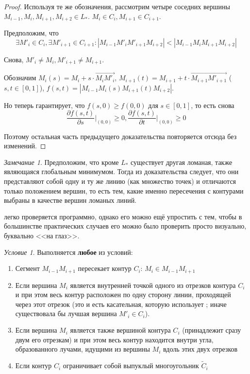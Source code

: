\documentclass[14pt]{extarticle}
\theoremstyle{plain}%
\theoremstyle{remark}
\newtheorem{remark}{Замечание}
\newtheorem{condition}{Условие}
\begin{document}
\begin{proof}
Используя те же обозначения,
рассмотрим четыре соседних вершины
$M_{i-1}, M_i, M_{i+1}, M_{i+2} \in L_*$.
$M_i \in  C_i,
M_{i+1} \in C_{i+1}$.

Предположим, что
$$
\exists M'_i \in C_i,
\exists M'_{i+1} \in C_{i+1}:
|M_{i-1} M'_i M'_{i+1} M_{i+2}|
<
|M_{i-1} M_i M_{i+1} M_{i+2}|
$$

Снова,
$
M'_i \ne M_i,
M'_{i+1} \ne M_{i+1}
$.

Обозначим
$
M_i(s)=M_i+s \cdot \overrightarrow{M_i M'_i}
$,
$
 M_{i+1}(t)= M_{i+1}+t \cdot \overrightarrow{M_{i+1} M'_{i+1}}
$
($s,t \in[0,1]$),
$f(s,t)=
|M_{i-1} M_i(s) M_{i+1}(t) M_{i+2}|
$.

Но теперь
гарантирует, что
$f(s,0)\geqslant f(0,0)$
для
$s\in[0,1]$,
то есть снова
\begin{equation}
  \frac{\partial f(s,t)}{\partial s} \Big|_{(0,0)} \geqslant 0,
  \frac{\partial f(s,t)}{\partial t} \Big|_{(0,0)} \geqslant 0
\end{equation}

Поэтому остальная часть предыдущего доказательства
повторяется отсюда без изменений.
\end{proof}

\begin{remark}
Предположим,
что кроме
$L_*$
существует другая ломаная,
также являющаяся глобальным минимумом.
Тогда из доказательства следует,
что они представляют собой одну и ту же
линию
(как множество точек)
и отличаются только положением вершин,
то есть тем, какие именно пересечения
с контурами
выбраны в качестве вершин ломаных линий.
\end{remark}

легко проверяется программно,
однако его можно ещё упростить с тем,
чтобы в большинстве практических случаев
его можно было проверить просто визуально,
буквально <<на глаз>>.

\begin{condition}
  Выполняется \textbf{любое} из условий:
  \begin{enumerate}
    \item
    Сегмент
    $M_{i-1} M_{i+1}$
    пересекает контур
    $C_i$:
    $M_i \in M_{i-1} M_{i+1}$
    \item
    Если вершина
    $M_i$
    является внутренней точкой одного из
    отрезков контура
    $C_i$
    и при этом весь контур расположен
    по одну сторону линии,
    проходящей через этот отрезок
    (это и есть касательная,
    которую использует ;
    иначе существовала бы лучшая вершина
    $M'_i\in C_i$).
    \item
    Если вершина
    $M_i$
    является также вершиной контура
    $C_i$
    (принадлежит сразу двум его отрезкам)
    и при этом весь контур находится
    внутри угла,
    образованного лучами,
    идущими из вершины
    $M_i$
    вдоль этих двух отрезков
    \item
    Если контур
    $C_i$
    ограничивает собой выпуклый
    многоугольник
    $\tilde C_i$
  \end{enumerate}
\end{condition}
\end{document}
